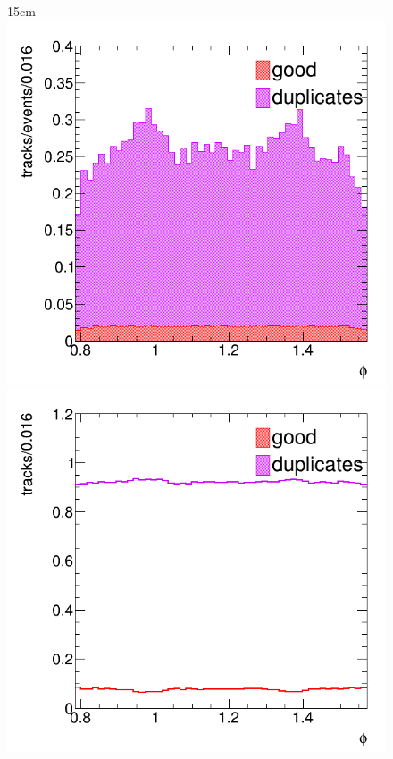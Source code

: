 \begin{figure}[htbp]{15cm}
	\includegraphics[scale=0.23]{AppendixCMSL1TT/figs/single_muon_nopu_tcat/am_tracks_categorization_vs_phi_allogics_nodupremoval}
	\includegraphics[scale=0.23]{AppendixCMSL1TT/figs/single_muon_nopu_tcat/am_tracks_ratio_vs_phi_allogics_nodupremoval}

\end{figure}
